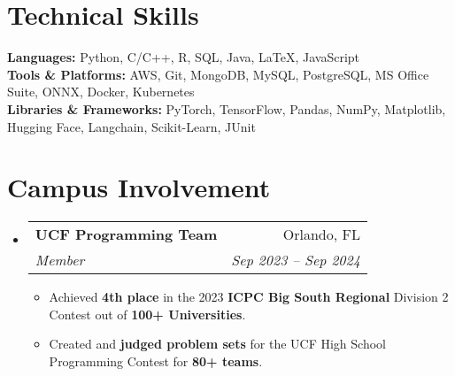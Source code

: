 \documentclass[letterpaper,11pt]{article}
\makeatletter
\newcommand{\resumeItem}[1]{
  \item\small{
    {#1 \vspace{-2pt}}
  }
}
\newcommand{\resumeSubheading}[4]{
  \vspace{-2pt}\item
    \begin{tabular*}{0.97\textwidth}[t]{l@{\extracolsep{\fill}}r}
      \textbf{#1} & #2 \\
      \textit{\small#3} & \textit{\small #4} \\
    \end{tabular*}\vspace{-7pt}
}
\newcommand{\resumeSubHeadingListStart}{\begin{itemize}[leftmargin=0.15in, label={}]}
\newcommand{\resumeSubHeadingListEnd}{\end{itemize}}
\newcommand{\resumeItemListStart}{\begin{itemize}}
\newcommand{\resumeItemListEnd}{\end{itemize}\vspace{-5pt}}
\makeatother
\begin{document}
\section{Technical Skills}
  \begin{itemize}[leftmargin=0.15in, label={}]
    \small{\item{
      \textbf{Languages:}{ Python, C/C++, R, SQL, Java, LaTeX, JavaScript} \\
      \textbf{Tools \& Platforms:}{ AWS, Git, MongoDB, MySQL, PostgreSQL, MS Office Suite, ONNX, Docker, Kubernetes} \\
      \textbf{Libraries \& Frameworks:}{ PyTorch, TensorFlow, Pandas, NumPy, Matplotlib, Hugging Face, Langchain, Scikit-Learn, JUnit}
    }}
  \end{itemize}

\section{Campus Involvement}
  \resumeSubHeadingListStart
    \resumeSubheading
      {UCF Programming Team}{Orlando, FL}
      {Member}{Sep 2023 -- Sep 2024}
      \resumeItemListStart
        \resumeItem{Achieved \textbf{4th place} in the 2023 \textbf{ICPC Big South Regional} Division 2 Contest out of \textbf{100+ Universities}.}
        \resumeItem{Created and \textbf{judged problem sets} for the UCF High School Programming Contest for \textbf{80+ teams}.}
      \resumeItemListEnd
  \resumeSubHeadingListEnd
\end{document}

